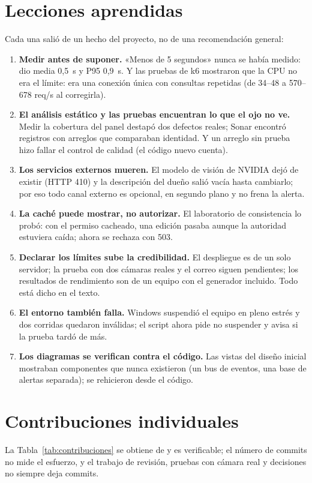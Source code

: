 \section{Lecciones aprendidas}
Cada una salió de un hecho del proyecto, no de una recomendación general:

\begin{enumerate}
  \item \textbf{Medir antes de suponer.} «Menos de 5 segundos» nunca se había medido:  dio media 0,5~s y P95 0,9~s. Y las
  pruebas de k6 mostraron que la CPU no era el límite: era una conexión única con consultas repetidas (de 34--48 a 570--678 req/s al corregirla).
  \item \textbf{El análisis estático y las pruebas encuentran lo que el ojo no ve.} Medir la cobertura del panel destapó dos defectos reales;
  Sonar encontró registros con arreglos que comparaban identidad. Y un arreglo sin prueba hizo fallar el control de calidad (el código nuevo cuenta).
  \item \textbf{Los servicios externos mueren.} El modelo de visión de NVIDIA dejó de existir (HTTP 410) y la descripción del dueño salió vacía hasta
  cambiarlo; por eso todo canal externo es opcional, en segundo plano y no frena la alerta.
  \item \textbf{La caché puede mostrar, no autorizar.} El laboratorio de consistencia lo probó: con el permiso cacheado, una edición pasaba aunque la
  autoridad estuviera caída; ahora se rechaza con 503.
  \item \textbf{Declarar los límites sube la credibilidad.} El despliegue es de un solo servidor; la prueba con dos cámaras reales y el correo siguen
  pendientes; los resultados de rendimiento son de un equipo con el generador incluido. Todo está dicho en el texto.
  \item \textbf{El entorno también falla.} Windows suspendió el equipo en pleno estrés y dos corridas quedaron inválidas; el script ahora pide no
  suspender y avisa si la prueba tardó de más.
  \item \textbf{Los diagramas se verifican contra el código.} Las vistas del diseño inicial mostraban componentes que nunca existieron (un bus de
  eventos, una base de alertas separada); se rehicieron desde el código.
\end{enumerate}

\section{Contribuciones individuales}\label{sec:contribuciones}
La Tabla~\ref{tab:contribuciones} se obtiene de  y es verificable; el número de commits no mide el esfuerzo, y el trabajo de
revisión, pruebas con cámara real y decisiones no siempre deja commits.

